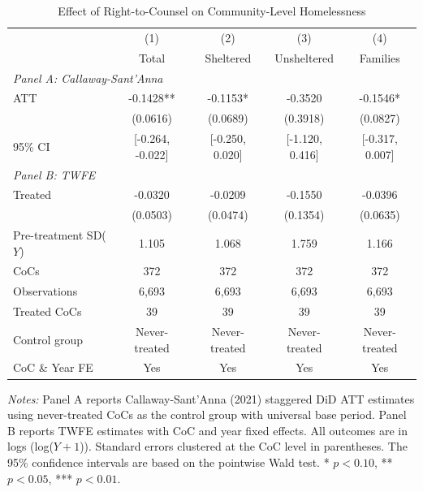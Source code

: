 \begin{table}[htbp]
\centering
\caption{Effect of Right-to-Counsel on Community-Level Homelessness}
\label{tab:main}
\begin{tabular}{lcccc}
\hline\hline
 & (1) & (2) & (3) & (4) \\
 & Total & Sheltered & Unsheltered & Families \\
\hline
\multicolumn{5}{l}{\textit{Panel A: Callaway-Sant'Anna}} \\[4pt]
ATT & -0.1428** & -0.1153* & -0.3520 & -0.1546* \\
 & (0.0616) & (0.0689) & (0.3918) & (0.0827) \\
95\% CI & [-0.264, -0.022] & [-0.250, 0.020] & [-1.120, 0.416] & [-0.317, 0.007] \\[6pt]
\multicolumn{5}{l}{\textit{Panel B: TWFE}} \\[4pt]
Treated & -0.0320 & -0.0209 & -0.1550 & -0.0396 \\
 & (0.0503) & (0.0474) & (0.1354) & (0.0635) \\[6pt]
\hline
Pre-treatment SD($Y$) & 1.105 & 1.068 & 1.759 & 1.166 \\
CoCs & 372 & 372 & 372 & 372 \\
Observations & 6,693 & 6,693 & 6,693 & 6,693 \\
Treated CoCs & 39 & 39 & 39 & 39 \\
Control group & Never-treated & Never-treated & Never-treated & Never-treated \\
CoC \& Year FE & Yes & Yes & Yes & Yes \\
\hline\hline
\end{tabular}
\begin{tablenotes}
\item \textit{Notes:} Panel A reports Callaway-Sant'Anna (2021) staggered DiD ATT estimates using never-treated CoCs as the control group with universal base period. Panel B reports TWFE estimates with CoC and year fixed effects. All outcomes are in logs (log($Y + 1$)). Standard errors clustered at the CoC level in parentheses. The 95\% confidence intervals are based on the pointwise Wald test. * $p < 0.10$, ** $p < 0.05$, *** $p < 0.01$.
\end{tablenotes}
\end{table}
